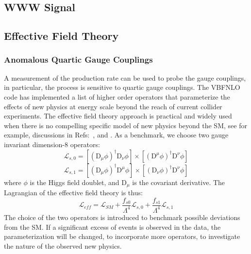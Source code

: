\subsection{WWW Signal}
\subsection{Effective Field Theory}
\subsubsection{Anomalous Quartic Gauge Couplings}

A measurement
of the production rate can be used to probe the gauge couplings, in
particular, the process is sensitive to quartic gauge couplings. The
{\sc VBFNLO } code has implemented a list of higher order operators
that parameterize the effects of new physics at energy scale beyond
the reach of current collider experiments.  The effective field theory
approach is practical and widely used when there is no compelling
specific model of new physics beyond the SM, see for example,
discussions in Refs:~\cite{Hagiwara:1993ck}, \cite{Buchmuller:1985jz}
and \cite{Eboli:2006wa}.  As a benchmark, we choose two gauge
invariant dimension-8 operators:
\begin{equation}
\mathcal{L}_{s,0} = [(\mathrm{D}_\mu\phi)^\dag\mathrm{D}_\nu \phi]\times [(\mathrm{D}^\mu\phi)^\dag\mathrm{D}^\nu \phi]
\end{equation}
\begin{equation}
\mathcal{L}_{s,1} = [(\mathrm{D}_\mu\phi)^\dag\mathrm{D}^\mu \phi]\times [(\mathrm{D}_\nu\phi)^\dag\mathrm{D}^\nu \phi]
\end{equation}
where $\phi$ is the Higgs field doublet, and $\mathrm{D}_\mu$ is the covariant derivative. 
The Lagrangian of the effective field theory is thus: 
\begin{equation}
\mathcal{L}_{eff} = \mathcal{L}_{SM} + \frac{f_{s0}}{\Lambda^4}\mathcal{L}_{s,0}+\frac{f_{s1}}{\Lambda^4}\mathcal{L}_{s,1}
\end{equation}
The choice of the two operators is introduced to benchmark possible
deviations from the SM. If a significant excess of events is 
observed in the data, the parameterization will be changed, to incorporate 
more operators, to
investigate the nature of the observed new physics.




